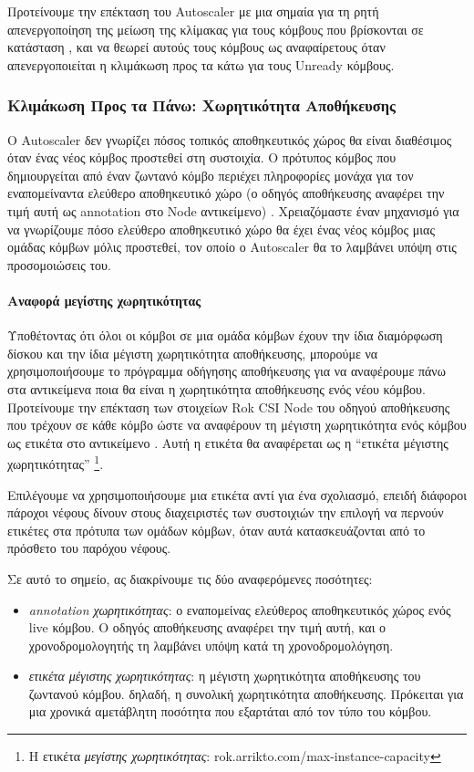 Προτείνουμε την επέκταση του Autoscaler με μια σημαία για τη ρητή απενεργοποίηση
της μείωση της κλίμακας για τους κόμβους που βρίσκονται σε κατάσταση
, και να θεωρεί αυτούς τους κόμβους ως αναφαίρετους όταν
απενεργοποιείται η κλιμάκωση προς τα κάτω  για τους Unready κόμβους.


\subsubsection{Κλιμάκωση Προς τα Πάνω: Χωρητικότητα Αποθήκευσης}

Ο Autoscaler δεν γνωρίζει πόσος τοπικός αποθηκευτικός χώρος θα είναι διαθέσιμος όταν
ένας νέος κόμβος προστεθεί στη συστοιχία. Ο πρότυπος κόμβος που δημιουργείται
από έναν ζωντανό κόμβο  περιέχει πληροφορίες μονάχα για τον εναπομείναντα
ελεύθερο αποθηκευτικό χώρο (ο οδηγός αποθήκευσης αναφέρει την τιμή αυτή ως
annotation στο Node αντικείμενο) . Χρειαζόμαστε έναν μηχανισμό για να γνωρίζουμε
πόσο ελεύθερο αποθηκευτικό χώρο θα έχει ένας νέος κόμβος μιας ομάδας κόμβων
μόλις προστεθεί, τον οποίο ο Autoscaler θα το λαμβάνει υπόψη στις προσομοιώσεις
του.

\paragraph*{Αναφορά μεγίστης χωρητικότητας}

Υποθέτοντας ότι όλοι οι κόμβοι σε μια ομάδα κόμβων έχουν την ίδια διαμόρφωση
δίσκου και την ίδια μέγιστη χωρητικότητα αποθήκευσης, μπορούμε να
χρησιμοποιήσουμε το πρόγραμμα οδήγησης αποθήκευσης για να αναφέρουμε πάνω στα
αντικείμενα  ποια θα είναι η χωρητικότητα αποθήκευσης ενός νέου κόμβου.
Προτείνουμε την επέκταση των στοιχείων Rok CSI Node του οδηγού αποθήκευσης που
τρέχουν σε κάθε κόμβο ώστε  να αναφέρουν τη μέγιστη χωρητικότητα ενός κόμβου ως
ετικέτα στο αντικείμενο . Αυτή η ετικέτα θα αναφέρεται ως η ``ετικέτα
μέγιστης χωρητικότητας'' \footnote{Η ετικέτα \textit{μεγίστης χωρητικότητας}:
rok.arrikto.com/max-instance-capacity}.

Επιλέγουμε να χρησιμοποιήσουμε μια ετικέτα αντί για ένα σχολιασμό, επειδή
διάφοροι πάροχοι νέφους δίνουν στους διαχειριστές των συστοιχιών την επιλογή να
περνούν ετικέτες στα πρότυπα των ομάδων κόμβων, όταν αυτά κατασκευάζονται από το
πρόσθετο του παρόχου νέφους.

Σε αυτό το σημείο, ας διακρίνουμε τις δύο αναφερόμενες ποσότητες:
\begin{itemize}
      \tightlist
      \item \textit{annotation χωρητικότητας}: ο εναπομείνας ελεύθερος
            αποθηκευτικός χώρος ενός live κόμβου. Ο οδηγός αποθήκευσης αναφέρει
            την τιμή αυτή, και ο  χρονοδρομολογητής τη λαμβάνει υπόψη κατά τη
            χρονοδρομολόγηση.
      \item \textit{ετικέτα μέγιστης χωρητικότητας}: η μέγιστη χωρητικότητα
            αποθήκευσης του ζωντανού κόμβου. δηλαδή, η συνολική χωρητικότητα
            αποθήκευσης. Πρόκειται για μια χρονικά αμετάβλητη ποσότητα που
            εξαρτάται από τον τύπο του κόμβου.
\end{itemize}


